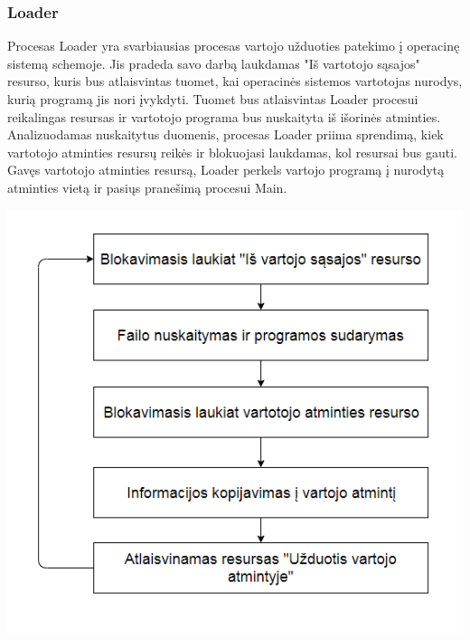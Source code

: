 \documentclass{scrartcl}
\begin{document}
      \subsubsection{Loader}
        Procesas Loader yra svarbiausias procesas vartojo užduoties patekimo į operacinę sistemą schemoje. Jis pradeda savo darbą laukdamas "Iš vartotojo sąsajos" resurso, kuris bus atlaisvintas tuomet, kai operacinės sistemos vartotojas nurodys, kurią programą jis nori įvykdyti. Tuomet bus atlaisvintas Loader procesui reikalingas resursas ir vartotojo programa bus nuskaityta iš išorinės atminties. Analizuodamas nuskaitytus duomenis, procesas Loader priima sprendimą, kiek vartotojo atminties resursų reikės ir blokuojasi laukdamas, kol resursai bus gauti. Gavęs vartotojo atminties resursą, Loader perkels vartojo programą į nurodytą atminties vietą ir pasiųs pranešimą procesui Main.
        \begin{center}
          \includegraphics[scale=1]{Loader}
        \end{center}
\end{document}
